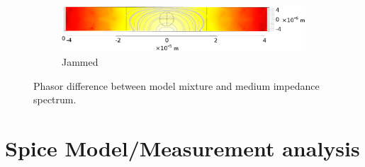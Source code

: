 \begin{figure}[h]
        \\
    \vspace{0.1 in}
    \begin{subfigure}[b]{\textwidth}
        \centering
        \includegraphics[width=\textwidth]{images/simple_cell_1Ghz.png}
        \caption{Jammed}
    \end{subfigure}
    \caption[Phasor difference between model mixture and medium impedance spectrum.]{Phasor difference between model mixture and medium impedance spectrum.}
    \label{fig:single_cell_model_IS_data}
\end{figure}

\FloatBarrier

\section{Spice Model/Measurement analysis}
